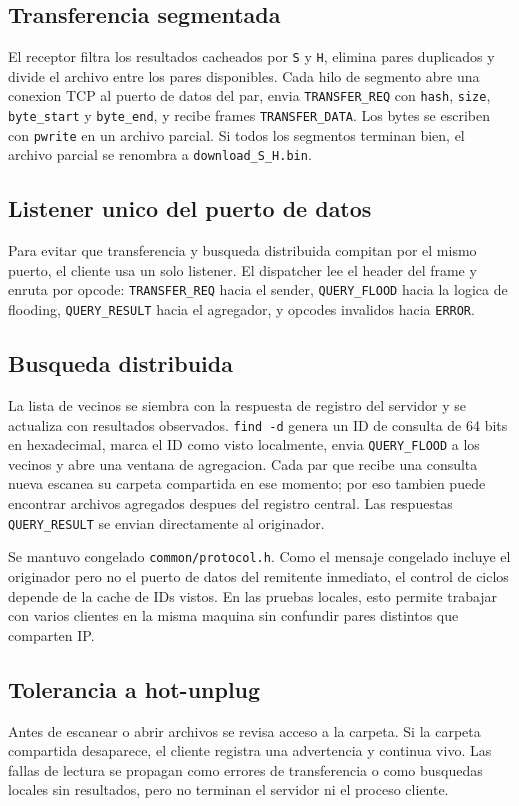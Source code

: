 \subsection{Transferencia segmentada}

El receptor filtra los resultados cacheados por \texttt{S} y \texttt{H},
elimina pares duplicados y divide el archivo entre los pares disponibles. Cada
hilo de segmento abre una conexion TCP al puerto de datos del par, envia
\texttt{TRANSFER\_REQ} con \texttt{hash}, \texttt{size}, \texttt{byte\_start}
y \texttt{byte\_end}, y recibe frames \texttt{TRANSFER\_DATA}. Los bytes se
escriben con \texttt{pwrite} en un archivo parcial. Si todos los segmentos
terminan bien, el archivo parcial se renombra a
\texttt{download\_S\_H.bin}.

\subsection{Listener unico del puerto de datos}

Para evitar que transferencia y busqueda distribuida compitan por el mismo
puerto, el cliente usa un solo listener. El dispatcher lee el header del frame
y enruta por opcode: \texttt{TRANSFER\_REQ} hacia el sender,
\texttt{QUERY\_FLOOD} hacia la logica de flooding,
\texttt{QUERY\_RESULT} hacia el agregador, y opcodes invalidos hacia
\texttt{ERROR}.

\subsection{Busqueda distribuida}

La lista de vecinos se siembra con la respuesta de registro del servidor y se
actualiza con resultados observados. \texttt{find -d} genera un ID de consulta
de 64 bits en hexadecimal, marca el ID como visto localmente, envia
\texttt{QUERY\_FLOOD} a los vecinos y abre una ventana de agregacion. Cada par
que recibe una consulta nueva escanea su carpeta compartida en ese momento; por
eso tambien puede encontrar archivos agregados despues del registro central.
Las respuestas \texttt{QUERY\_RESULT} se envian directamente al originador.

Se mantuvo congelado \texttt{common/protocol.h}. Como el mensaje congelado
incluye el originador pero no el puerto de datos del remitente inmediato, el
control de ciclos depende de la cache de IDs vistos. En las pruebas locales,
esto permite trabajar con varios clientes en la misma maquina sin confundir
pares distintos que comparten IP.

\subsection{Tolerancia a hot-unplug}

Antes de escanear o abrir archivos se revisa acceso a la carpeta. Si la carpeta
compartida desaparece, el cliente registra una advertencia y continua vivo. Las
fallas de lectura se propagan como errores de transferencia o como busquedas
locales sin resultados, pero no terminan el servidor ni el proceso cliente.
